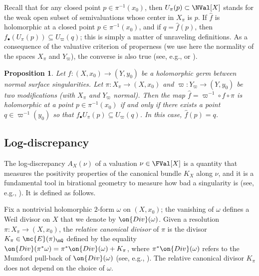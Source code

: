 \documentclass[11 pt, twoside, a4paper]{amsart}
\newcommand{\Kld}{{A}}
\newcommand{\Div}{\on{Div}}
\newcommand{\Ind}[1]{I_{#1}}	%
\newtheorem{prop}[thm]{Proposition}
\theoremstyle{definition}
\theoremstyle{definition}
\newcommand{\Ediv}[2][]{\mc{E}(#2)_{#1}}
\begin{document}
Recall that for any closed point $p\in \pi^{-1}(x_0)$, then $U_\pi(p)\subset \NVal[X]$ stands for the weak open subset of semivaluations whose center in $X_\pi$ is $p$. 
If $\hat{f}$ is holomorphic at a closed point $p\in \pi^{-1}(x_0)$, and if $q = \hat{f}(p)$, then $f_\bullet(U_\pi(p))\subseteq U_\varpi(q)$; this is simply a matter of unraveling definitions. As a consequence of the valuative criterion of properness (we use here the normality of the spaces $X_\pi$ and $Y_\varpi$), the converse is also true (see, e.g., \cite[Prop.\ 3.2]{favre-jonsson:eigenval} or \cite[Proposition 4.12]{gignac-ruggiero:locdynnoninvnormsurfsing}).


\begin{prop}\label{prop:valcritproperness}
Let $f\colon (X,x_0) \to (Y,y_0)$ be a holomorphic germ between normal surface singularities.
Let $\pi:X_\pi \to (X,x_0)$ and $\varpi:Y_\varpi \to (Y,y_0)$ be two modifications (with $X_\pi$ and $Y_\varpi$ normal).
Then the map $\hat{f}=\varpi^{-1} \circ f \circ \pi$ is holomorphic at a point $p \in \pi^{-1}(x_0)$ if and only if there exists a point $q \in \varpi^{-1}(y_0)$ so that $f_\bullet U_\pi(p) \subseteq U_\varpi(q)$.
In this case, $\hat{f}(p)=q$.
\end{prop}


\subsection{Log-discrepancy}

The log-discrepancy $\Kld_X(\nu)$ of a valuation $\nu \in \FVal[X]$ is a quantity that measures the positivity properties of the canonical bundle $K_X$ along $\nu$, and it is a fundamental tool in birational geometry to measure how bad a singularity is (see, e.g., \cite{kollar-mori:biratgeomalgvar,kollar:singMMP}). It is defined as follows.

Fix a nontrivial holomorphic $2$-form $\omega$ on $(X,x_0)$; the vanishing of $\omega$ defines a Weil divisor on $X$ that we denote by $\Div(\omega)$.
Given a resolution $\pi\colon X_\pi\to (X, x_0)$, the \emph{relative canonical divisor} of $\pi$ is the divisor $K_\pi\in \Ediv[\nQ]{\pi}$ defined by the equality $\Div(\pi^*\omega) = \pi^*\Div(\omega) + K_\pi$, where $\pi^*\Div(\omega)$ refers to the Mumford pull-back of $\Div(\omega)$ (see,  e.g., \cite[p.\ 195]{matsuki:mori-program}). The relative canonical divisor $K_\pi$ does not depend on the choice of $\omega$.
\end{document}
